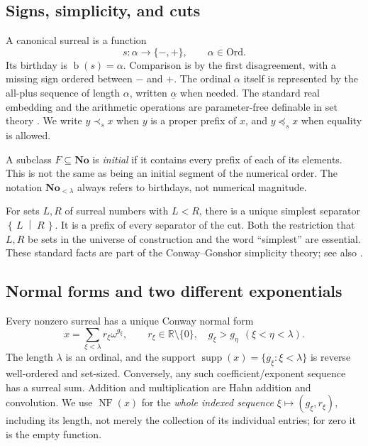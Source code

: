 \documentclass[11pt,a4paper]{article}
\numberwithin{equation}{section}
\theoremstyle{definition}
\theoremstyle{remark}
\newcommand{\No}{\mathbf{No}}
\newcommand{\Ord}{\mathrm{Ord}}
\newcommand{\R}{\mathbb R}
\newcommand{\bd}{\operatorname{b}}
\newcommand{\supp}{\operatorname{supp}}
\newcommand{\NF}{\operatorname{NF}}
\newcommand{\ps}{\mathrel{\prec_s}}
\newcommand{\pseq}{\mathrel{\preceq_s}}
\newcommand{\cut}[2]{\left\{\,#1\;\middle|\;#2\,\right\}}
\begin{document}
\subsection{Signs, simplicity, and cuts}

A canonical surreal is a function
\[
 s:\alpha\longrightarrow\{-,+\},\qquad\alpha\in\Ord.
\]
Its birthday is $\bd(s)=\alpha$. Comparison is by the first disagreement,
with a missing sign ordered between $-$ and $+$. The ordinal $\alpha$
itself is represented by the all-plus sequence of length $\alpha$, written
$\underline\alpha$ when needed. The standard real embedding and the
arithmetic operations are parameter-free definable in set theory
\cite{Conway,Gonshor}. We write $y\ps x$ when $y$ is a proper prefix of
$x$, and $y\pseq x$ when equality is allowed.

A subclass $F\subseteq\No$ is \emph{initial} if it contains every prefix of
each of its elements. This is not the same as being an initial segment of
the numerical order. The notation $\No_{<\lambda}$ always refers to
birthdays, not numerical magnitude.

For sets $L,R$ of surreal numbers with $L<R$, there is a unique simplest
separator $\cut LR$. It is a prefix of every separator of the cut. Both the
restriction that $L,R$ be sets in the universe of construction and the
word ``simplest'' are essential. These standard facts are part of the
Conway--Gonshor simplicity theory; see also \cite{EhrlichKaplan}.

\subsection{Normal forms and two different exponentials}\label{dsn:sub:normal}

Every nonzero surreal has a unique Conway normal form
\begin{equation}\label{dsn:eq:normal}
 x=\sum_{\xi<\lambda}r_\xi\omega^{g_\xi},
 \qquad r_\xi\in\R\setminus\{0\},\quad
 g_\xi>g_\eta\ \ (\xi<\eta<\lambda).
\end{equation}
The length $\lambda$ is an ordinal, and the support
$\supp(x)=\{g_\xi:\xi<\lambda\}$ is reverse well-ordered and set-sized.
Conversely, any such coefficient/exponent sequence has a surreal sum.
Addition and multiplication are Hahn addition and convolution. We use
$\NF(x)$ for the \emph{whole indexed sequence}
$\xi\mapsto(g_\xi,r_\xi)$, including its length, not merely the
collection of its individual entries; for zero it is the empty function.
\end{document}

